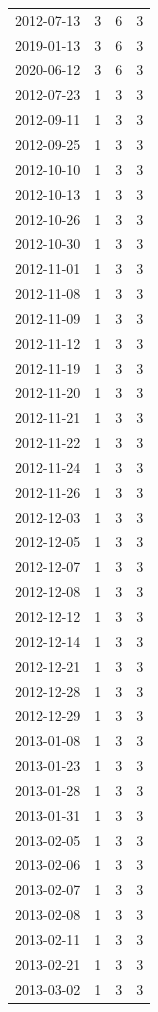 \begin{tabular}{lrrr}
2012-07-13 & 3 & 6 & 3 \\
2019-01-13 & 3 & 6 & 3 \\
2020-06-12 & 3 & 6 & 3 \\
2012-07-23 & 1 & 3 & 3 \\
2012-09-11 & 1 & 3 & 3 \\
2012-09-25 & 1 & 3 & 3 \\
2012-10-10 & 1 & 3 & 3 \\
2012-10-13 & 1 & 3 & 3 \\
2012-10-26 & 1 & 3 & 3 \\
2012-10-30 & 1 & 3 & 3 \\
2012-11-01 & 1 & 3 & 3 \\
2012-11-08 & 1 & 3 & 3 \\
2012-11-09 & 1 & 3 & 3 \\
2012-11-12 & 1 & 3 & 3 \\
2012-11-19 & 1 & 3 & 3 \\
2012-11-20 & 1 & 3 & 3 \\
2012-11-21 & 1 & 3 & 3 \\
2012-11-22 & 1 & 3 & 3 \\
2012-11-24 & 1 & 3 & 3 \\
2012-11-26 & 1 & 3 & 3 \\
2012-12-03 & 1 & 3 & 3 \\
2012-12-05 & 1 & 3 & 3 \\
2012-12-07 & 1 & 3 & 3 \\
2012-12-08 & 1 & 3 & 3 \\
2012-12-12 & 1 & 3 & 3 \\
2012-12-14 & 1 & 3 & 3 \\
2012-12-21 & 1 & 3 & 3 \\
2012-12-28 & 1 & 3 & 3 \\
2012-12-29 & 1 & 3 & 3 \\
2013-01-08 & 1 & 3 & 3 \\
2013-01-23 & 1 & 3 & 3 \\
2013-01-28 & 1 & 3 & 3 \\
2013-01-31 & 1 & 3 & 3 \\
2013-02-05 & 1 & 3 & 3 \\
2013-02-06 & 1 & 3 & 3 \\
2013-02-07 & 1 & 3 & 3 \\
2013-02-08 & 1 & 3 & 3 \\
2013-02-11 & 1 & 3 & 3 \\
2013-02-21 & 1 & 3 & 3 \\
2013-03-02 & 1 & 3 & 3 \\

\end{tabular}

